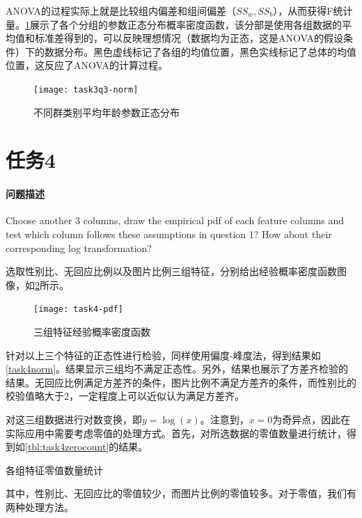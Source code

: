 \documentclass[a4paper,12pt]{article}
\begin{document}
    ANOVA的过程实际上就是比较组内偏差和组间偏差（$SS_w, SS_b$），从而获得F统计量。\cref{fig:task3q3-norm}展示了各个分组的参数正态分布概率密度函数，该分部是使用各组数据的平均值和标准差得到的，可以反映理想情况（数据均为正态，这是ANOVA的假设条件）下的数据分布。黑色虚线标记了各组的均值位置，黑色实线标记了总体的均值位置，这反应了ANOVA的计算过程。
    \begin{figure}
      \centering
      \texttt{[image: task3q3-norm]}
      \caption{不同群类别平均年龄参数正态分布}
      \label{fig:task3q3-norm}
    \end{figure}

    \section{任务4} %
    \paragraph{问题描述} Choose another 3 columns, draw the empirical pdf of each feature columns and test which column follows these assumptions in question 1? How about their corresponding log transformation?

    选取性别比、无回应比例以及图片比例三组特征，分别给出经验概率密度函数图像，如\cref{fig:gnn}所示。

    \begin{figure}[htbp]
        \centering
        \texttt{[image: task4-pdf]}
        \caption{三组特征经验概率密度函数}
        \label{fig:gnn}
    \end{figure}

    针对以上三个特征的正态性进行检验，同样使用偏度-峰度法，得到结果如\cref{task4norm}。结果显示三组均不满足正态性。另外，结果也展示了方差齐检验的结果。无回应比例满足方差齐的条件，图片比例不满足方差齐的条件，而性别比的校验值略大于2，一定程度上可以近似认为满足方差齐。
    

    对这三组数据进行对数变换，即$y=\log(x)$。注意到，$x=0$为奇异点，因此在实际应用中需要考虑零值的处理方式。首先，对所选数据的零值数量进行统计，得到如\cref{tbl:task4zerocount}的结果。

    \begin{table}[htbp]
      \centering
      \caption{各组特征零值数量统计}
      \label{tbl:task4zerocount}
      
    \end{table}

    其中，性别比、无回应比的零值较少，而图片比例的零值较多。对于零值，我们有两种处理方法。
\end{document}
